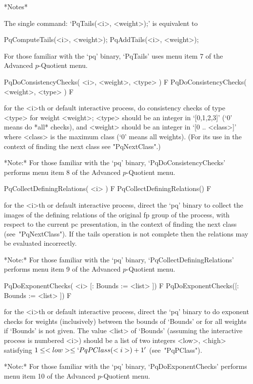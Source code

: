 *Notes*

The single command: `PqTails(<i>, <weight>);' is equivalent to

PqComputeTails(<i>, <weight>);
PqAddTails(<i>, <weight>);

For those familiar with the `pq' binary, `PqTails' uses menu  item  7  of
the Advanced $p$-Quotient menu.

\>PqDoConsistencyChecks( <i>, <weight>, <type> ) F
\>PqDoConsistencyChecks( <weight>, <type> ) F

for the <i>th or default interactive  {\ANUPQ}  process,  do  consistency
checks of type <type> for weight <weight>; <type> should be an integer in
`[0,1,2,3]' (`0' means do  *all*  checks),  and  <weight>  should  be  an
integer in `[0 .. <class>]' where <class> is the maximum class (`0' means
all weights). (For its use in the context of finding the next  class  see
"PqNextClass".)

*Note:*
For those familiar with the `pq' binary, `PqDoConsistencyChecks' performs
menu item 8 of the Advanced $p$-Quotient menu.

\>PqCollectDefiningRelations( <i> ) F
\>PqCollectDefiningRelations() F

for the <i>th or default interactive {\ANUPQ} process,  direct  the  `pq'
binary to collect the images of the defining relations of the original fp
group of the process, with respect to the current pc presentation, in the
context of finding the  next  class  (see~"PqNextClass").  If  the  tails
operation  is  not  complete  then  the  relations   may   be   evaluated
incorrectly.

*Note:*
For those familiar with  the  `pq'  binary,  `PqCollectDefiningRelations'
performs menu item 9 of the Advanced $p$-Quotient menu.

\>PqDoExponentChecks( <i> [: Bounds := <list> ]) F
\>PqDoExponentChecks([: Bounds := <list> ]) F

for the <i>th or default interactive {\ANUPQ} process, direct  the  `pq'
binary to do exponent checks for weights (inclusively) between the bounds
of `Bounds' or for all weights if `Bounds' is not given. The value <list>
of `Bounds' (assuming the interactive process is numbered <i>) should  be
a list of  two  integers  <low>,  <high>  satisfying  $1  \le  <low>  \le
`PqPClass(<i>) + 1'$ (see~"PqPClass").

*Note:*
For those familiar with the `pq'  binary,  `PqDoExponentChecks'  performs
menu item 10 of the Advanced $p$-Quotient menu.

